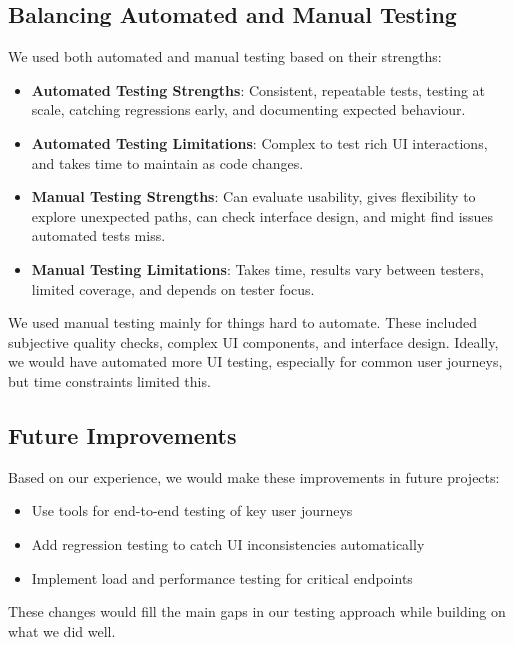 \subsection{Balancing Automated and Manual Testing}

We used both automated and manual testing based on their strengths:

\begin{itemize}
    \item \textbf{Automated Testing Strengths}: Consistent, repeatable tests, testing at scale, catching regressions early, and documenting expected behaviour.
    
    \item \textbf{Automated Testing Limitations}: Complex to test rich UI interactions, and takes time to maintain as code changes.
    
    \item \textbf{Manual Testing Strengths}: Can evaluate usability, gives flexibility to explore unexpected paths, can check interface design, and might find issues automated tests miss.
    
    \item \textbf{Manual Testing Limitations}: Takes time, results vary between testers, limited coverage, and depends on tester focus.
\end{itemize}

We used manual testing mainly for things hard to automate. These included subjective quality checks, complex UI components, and interface design. Ideally, we would have automated more UI testing, especially for common user journeys, but time constraints limited this.

\subsection{Future Improvements}

Based on our experience, we would make these improvements in future projects:

\begin{itemize}
    \item Use tools for end-to-end testing of key user journeys
    \item Add regression testing to catch UI inconsistencies automatically
    \item Implement load and performance testing for critical endpoints
\end{itemize}

These changes would fill the main gaps in our testing approach while building on what we did well.